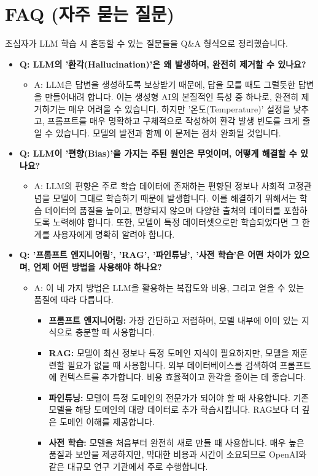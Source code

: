 \documentclass[11pt,a4paper]{article}
\begin{document}
\newpage
\section{FAQ (자주 묻는 질문)}

초심자가 LLM 학습 시 혼동할 수 있는 질문들을 Q&A 형식으로 정리했습니다.

\begin{itemize}
    \item \textbf{Q: LLM의 '환각(Hallucination)'은 왜 발생하며, 완전히 제거할 수 있나요?}
    \begin{itemize}
        \item A: LLM은 답변을 생성하도록 보상받기 때문에, 답을 모를 때도 그럴듯한 답변을 만들어내려 합니다. 이는 생성형 AI의 본질적인 특성 중 하나로, 완전히 제거하기는 매우 어려울 수 있습니다. 하지만 '온도(Temperature)' 설정을 낮추고, 프롬프트를 매우 명확하고 구체적으로 작성하여 환각 발생 빈도를 크게 줄일 수 있습니다. 모델의 발전과 함께 이 문제는 점차 완화될 것입니다.
    \end{itemize}

    \item \textbf{Q: LLM이 '편향(Bias)'을 가지는 주된 원인은 무엇이며, 어떻게 해결할 수 있나요?}
    \begin{itemize}
        \item A: LLM의 편향은 주로 학습 데이터에 존재하는 편향된 정보나 사회적 고정관념을 모델이 그대로 학습하기 때문에 발생합니다. 이를 해결하기 위해서는 학습 데이터의 품질을 높이고, 편향되지 않으며 다양한 출처의 데이터를 포함하도록 노력해야 합니다. 또한, 모델이 특정 데이터셋으로만 학습되었다면 그 한계를 사용자에게 명확히 알려야 합니다.
    \end{itemize}

    \item \textbf{Q: '프롬프트 엔지니어링', 'RAG', '파인튜닝', '사전 학습'은 어떤 차이가 있으며, 언제 어떤 방법을 사용해야 하나요?}
    \begin{itemize}
        \item A: 이 네 가지 방법은 LLM을 활용하는 복잡도와 비용, 그리고 얻을 수 있는 품질에 따라 다릅니다.
        \begin{itemize}
            \item \textbf{프롬프트 엔지니어링:} 가장 간단하고 저렴하며, 모델 내부에 이미 있는 지식으로 충분할 때 사용합니다.
            \item \textbf{RAG:} 모델이 최신 정보나 특정 도메인 지식이 필요하지만, 모델을 재훈련할 필요가 없을 때 사용합니다. 외부 데이터베이스를 검색하여 프롬프트에 컨텍스트를 추가합니다. 비용 효율적이고 환각을 줄이는 데 좋습니다.
            \item \textbf{파인튜닝:} 모델이 특정 도메인의 전문가가 되어야 할 때 사용합니다. 기존 모델을 해당 도메인의 대량 데이터로 추가 학습시킵니다. RAG보다 더 깊은 도메인 이해를 제공합니다.
            \item \textbf{사전 학습:} 모델을 처음부터 완전히 새로 만들 때 사용합니다. 매우 높은 품질과 보안을 제공하지만, 막대한 비용과 시간이 소요되므로 OpenAI와 같은 대규모 연구 기관에서 주로 수행합니다.
        \end{itemize}
    \end{itemize}


\end{itemize}
\end{document}
